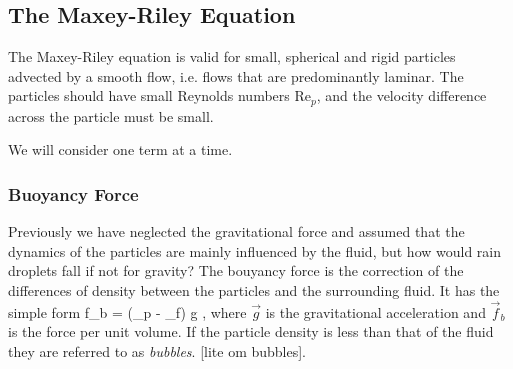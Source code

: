 
\subsection{The Maxey-Riley Equation}






The Maxey-Riley equation is valid for small, spherical and rigid particles advected by a smooth flow, i.e. flows that are predominantly laminar. The particles should have small Reynolds numbers Re$_p$, and the velocity difference across 
the particle must be small. 



We will consider one term at a time. 

\subsubsection{Buoyancy Force}

Previously we have neglected the gravitational force and assumed that the dynamics of the particles are mainly influenced by the fluid, but how would rain droplets fall if not for gravity? The bouyancy force is the correction of the differences of density between the particles and the surrounding fluid. It has the simple form
\beq
\vec f_b = (\rho_p - \rho_f) \vec g ,
\eeq
where $\vec g$ is the gravitational acceleration and %
$\vec f_b$ is the force per unit volume. If the particle density is less than that of the fluid they are referred to as \emph{bubbles}. [lite om bubbles]. 

